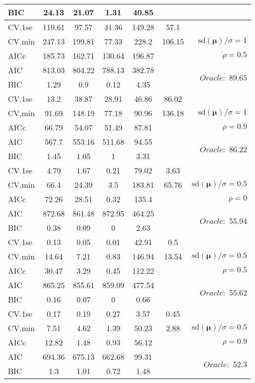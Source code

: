 \begin{table}
\begin{center}
\begin{tabular}{l*{5}{c}|r}
BIC & 24.13 & 21.07 & 1.31 & 40.85 & &  \\
 \hline 
CV.1se & 110.61 & 97.57 & 41.36 & 149.28 & 57.1 & \\
CV.min & 247.13 & 199.81 & 77.33 & 228.2 & 106.15 &  $\mathrm{sd}(\mathbf{\mu})/\sigma=1$ \\
AICc & 185.73 & 162.71 & 130.64 & 196.87 & & $\rho=0.5$ \\
AIC & 813.03 & 804.22 & 788.13 & 382.78 & &  \multirow{2}{*}{$Oracle: $ 89.65} \\
BIC & 1.29 & 0.9 & 0.12 & 4.35 & &  \\
 \hline 
CV.1se & 13.2 & 38.87 & 28.91 & 46.86 & 86.02 & \\
CV.min & 91.69 & 148.19 & 77.18 & 90.96 & 136.18 &  $\mathrm{sd}(\mathbf{\mu})/\sigma=1$ \\
AICc & 66.79 & 54.07 & 51.49 & 87.81 & & $\rho=0.9$ \\
AIC & 567.7 & 553.16 & 511.68 & 94.55 & &  \multirow{2}{*}{$Oracle: $ 86.22} \\
BIC & 1.45 & 1.05 & 1 & 3.31 & &  \\
 \hline 
CV.1se & 4.79 & 1.67 & 0.21 & 79.02 & 3.63 & \\
CV.min & 66.4 & 24.39 & 3.5 & 183.81 & 65.76 &  $\mathrm{sd}(\mathbf{\mu})/\sigma=0.5$ \\
AICc & 72.26 & 28.51 & 0.32 & 135.4 & & $\rho=0$ \\
AIC & 872.68 & 861.48 & 872.95 & 464.25 & &  \multirow{2}{*}{$Oracle: $ 55.94} \\
BIC & 0.38 & 0.09 & 0 & 2.63 & &  \\
 \hline 
CV.1se & 0.13 & 0.05 & 0.01 & 42.91 & 0.5 & \\
CV.min & 14.64 & 7.21 & 0.83 & 146.94 & 13.54 &  $\mathrm{sd}(\mathbf{\mu})/\sigma=0.5$ \\
AICc & 30.47 & 3.29 & 0.45 & 112.22 & & $\rho=0.5$ \\
AIC & 865.25 & 855.61 & 859.09 & 477.54 & &  \multirow{2}{*}{$Oracle: $ 55.62} \\
BIC & 0.16 & 0.07 & 0 & 0.66 & &  \\
 \hline 
CV.1se & 0.17 & 0.19 & 0.27 & 3.57 & 0.45 & \\
CV.min & 7.51 & 4.62 & 1.39 & 50.23 & 2.88 &  $\mathrm{sd}(\mathbf{\mu})/\sigma=0.5$ \\
AICc & 12.82 & 1.48 & 0.93 & 56.12 & & $\rho=0.9$ \\
AIC & 694.36 & 675.13 & 662.68 & 99.31 & &  \multirow{2}{*}{$Oracle: $ 52.3} \\
BIC & 1.3 & 1.01 & 0.72 & 1.48 & &  \\
 \hline 
\end{tabular}
\end{center}
\vspace{-1cm}
\end{table}





